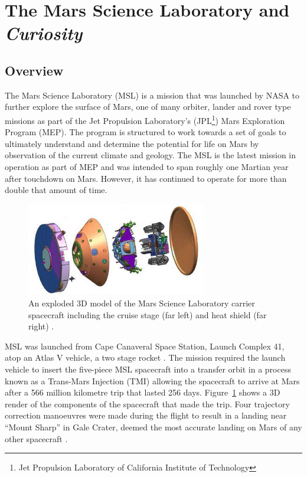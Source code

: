   \section{The Mars Science Laboratory and \textit{Curiosity}}
    \subsection{Overview}
      The Mars Science Laboratory (MSL) is a mission that was launched by NASA to further explore the surface of Mars, one of many orbiter, lander and rover type missions as part of the Jet Propulsion Laboratory's (JPL\footnote{Jet Propulsion Laboratory of California Institute of Technology}) Mars Exploration Program (MEP). The program is structured to work towards a set of goals to ultimately understand and determine the potential for life on Mars \cite{meptheme} by observation of the current climate and geology. The MSL is the latest mission in operation as part of MEP and was intended to span roughly one Martian year after touchdown on Mars. However, it has continued to operate for more than double that amount of time. 
      
      \begin{figure}[ht]
        \centering
        \includegraphics[width=0.7\textwidth]{figures/mslSpacecraftExplodedView.jpg}
        \caption[An exploded 3D model of the Mars Science Laboratory carrier spacecraft including the cruise stage (far left) and heat shield (far right).]{An exploded 3D model of the Mars Science Laboratory carrier spacecraft including the cruise stage (far left) and heat shield (far right) \cite{fig:mslSpacecraftExplodedView_cite}.}
        \label{fig:mslSpacecraftExplodedView}
      \end{figure}
      
      
      MSL was launched from Cape Canaveral Space Station, Launch Complex 41, atop an Atlas V vehicle, a two stage rocket \cite{harwood2014sfn}. The mission required the launch vehicle to insert the five-piece MSL spacecraft into a transfer orbit in a process known as a Trans-Mars Injection (TMI) allowing the spacecraft to arrive at Mars after a 566 million kilometre trip that lasted 256 days. Figure~\ref{fig:mslSpacecraftExplodedView} shows a 3D render of the components of the spacecraft that made the trip. Four trajectory correction manoeuvres were made during the flight to result in a landing near ``Mount Sharp'' in Gale Crater, deemed the most accurate landing on Mars of any other spacecraft \cite{martinmur}.
      
